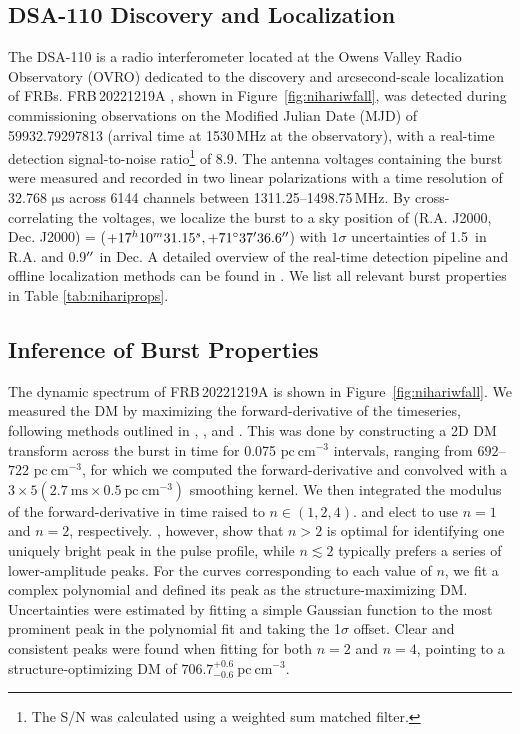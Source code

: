 \documentclass[twocolumn, linenumbers, tra]{aastex631}
\newcommand{\nihari}{FRB\,20221219A } %
\begin{document}
\subsection{DSA-110 Discovery and Localization}\label{sec:localization}

The DSA-110 is a radio interferometer located at the Owens Valley Radio Observatory (OVRO) dedicated to the discovery and arcsecond-scale localization of FRBs. \nihari, shown in Figure\ \ref{fig:nihariwfall}, was detected during commissioning observations on the Modified Julian Date (MJD) of 59932.79297813 (arrival time at 1530\,MHz at the observatory), with a real-time detection signal-to-noise ratio\footnote{The S/N was calculated using a weighted sum matched filter.} of 8.9. The antenna voltages containing the burst were measured and recorded in two linear polarizations with a time resolution of 32.768 $\mathrm{\mu s}$ across 6144 channels between 1311.25--1498.75\,MHz. By cross-correlating the voltages, we localize the burst to a sky position of (R.A. J2000, Dec. J2000) = ($+17^{h}10^{m}31.15^{s}, +71^{\circ}37\mbox{$^\prime$}36.6\mbox{$^{\prime\prime}$}$) with $1\sigma$ uncertainties of 1.5\arcsec\ in R.A. and 0.9$\mbox{$^{\prime\prime}$}$ in Dec. A detailed overview of the real-time detection pipeline and offline localization methods can be found in \citet{Ravi2023b}. We list all relevant burst properties in Table \ref{tab:nihariprops}.

\subsection{Inference of Burst Properties}\label{sec:burstprop}

The dynamic spectrum of \nihari is shown in Figure\ \ref{fig:nihariwfall}. We measured the DM by maximizing the forward-derivative of the timeseries, following methods outlined in \cite{Gajjar2018}, \cite{Hessels2019}, and \cite{Josephy2019}. This was done by constructing a 2D DM transform across the burst in time for 0.075 $\mathrm{pc}\ \mathrm{cm}^{-3}$ intervals, ranging from $692$--$722$ $\mathrm{pc}\ \mathrm{cm}^{-3}$, for which we computed the forward-derivative and convolved with a $3 \times 5\left(2.7\ \mathrm{ms} \times 0.5 \ \mathrm{pc} \ \mathrm{cm}^{-3}\right)$ smoothing kernel. We then integrated the modulus of the forward-derivative in time raised to $n \in(1,2,4)$. \cite{Gajjar2018} and \cite{Hessels2019} elect to use $n=1$ and $n=2$, respectively. \cite{Josephy2019}, however, show that $n > 2$ is optimal for identifying one uniquely bright peak in the pulse profile, while $n \lesssim 2$ typically prefers a series of lower-amplitude peaks. For the curves corresponding to each value of $n$, we fit a complex polynomial and defined its peak as the structure-maximizing DM. Uncertainties were estimated by fitting a simple Gaussian function to the most prominent peak in the polynomial fit and taking the 1$\sigma$ offset. Clear and consistent peaks were found when fitting for both $n=2$ and $n=4$, pointing to a structure-optimizing DM of $706.7^{+0.6}_{-0.6}\ \mathrm{pc\ cm}^{-3}$.
\end{document}
